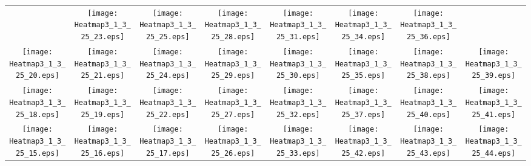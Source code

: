 \documentclass{standalone}
\begin{document}
\renewcommand{\arraystretch}{0}
\setlength{\tabcolsep}{0pt}
\begin{tabular}{ *8{c} }
 & \texttt{[image: Heatmap3\_1\_3\_25\_23.eps]} & \texttt{[image: Heatmap3\_1\_3\_25\_25.eps]} & \texttt{[image: Heatmap3\_1\_3\_25\_28.eps]} & \texttt{[image: Heatmap3\_1\_3\_25\_31.eps]} & \texttt{[image: Heatmap3\_1\_3\_25\_34.eps]} & \texttt{[image: Heatmap3\_1\_3\_25\_36.eps]} &  \\
\texttt{[image: Heatmap3\_1\_3\_25\_20.eps]} & \texttt{[image: Heatmap3\_1\_3\_25\_21.eps]} & \texttt{[image: Heatmap3\_1\_3\_25\_24.eps]} & \texttt{[image: Heatmap3\_1\_3\_25\_29.eps]} & \texttt{[image: Heatmap3\_1\_3\_25\_30.eps]} & \texttt{[image: Heatmap3\_1\_3\_25\_35.eps]} & \texttt{[image: Heatmap3\_1\_3\_25\_38.eps]} & \texttt{[image: Heatmap3\_1\_3\_25\_39.eps]} \\
\texttt{[image: Heatmap3\_1\_3\_25\_18.eps]} & \texttt{[image: Heatmap3\_1\_3\_25\_19.eps]} & \texttt{[image: Heatmap3\_1\_3\_25\_22.eps]} & \texttt{[image: Heatmap3\_1\_3\_25\_27.eps]} & \texttt{[image: Heatmap3\_1\_3\_25\_32.eps]} & \texttt{[image: Heatmap3\_1\_3\_25\_37.eps]} & \texttt{[image: Heatmap3\_1\_3\_25\_40.eps]} & \texttt{[image: Heatmap3\_1\_3\_25\_41.eps]} \\
\texttt{[image: Heatmap3\_1\_3\_25\_15.eps]} & \texttt{[image: Heatmap3\_1\_3\_25\_16.eps]} & \texttt{[image: Heatmap3\_1\_3\_25\_17.eps]} & \texttt{[image: Heatmap3\_1\_3\_25\_26.eps]} & \texttt{[image: Heatmap3\_1\_3\_25\_33.eps]} & \texttt{[image: Heatmap3\_1\_3\_25\_42.eps]} & \texttt{[image: Heatmap3\_1\_3\_25\_43.eps]} & \texttt{[image: Heatmap3\_1\_3\_25\_44.eps]} \\

\end{tabular}
\end{document}
